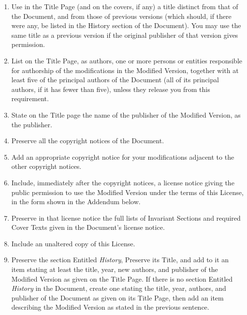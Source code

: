 \begin{enumerate}
\item Use in the Title Page (and on the covers, if any) a title
  distinct from that of the Document, and from those of previous
  versions (which should, if there were any, be listed in the History
  section of the Document).  You may use the same title as a previous
  version if the original publisher of that version gives permission.
   
\item List on the Title Page, as authors, one or more persons or
  entities responsible for authorship of the modifications in the
  Modified Version, together with at least five of the principal
  authors of the Document (all of its principal authors, if it has
  fewer than five), unless they release you from this requirement.
   
\item State on the Title page the name of the publisher of the
  Modified Version, as the publisher.
   
\item Preserve all the copyright notices of the Document.
   
\item Add an appropriate copyright notice for your modifications
  adjacent to the other copyright notices.
   
\item Include, immediately after the copyright notices, a license
  notice giving the public permission to use the Modified Version
  under the terms of this License, in the form shown in the Addendum
  below.
   
\item Preserve in that license notice the full lists of Invariant
  Sections and required Cover Texts given in the Document's license
  notice.
   
\item Include an unaltered copy of this License.
   
\item Preserve the section Entitled \emph{History}, Preserve its
  Title, and add to it an item stating at least the title, year, new
  authors, and publisher of the Modified Version as given on the Title
  Page.  If there is no section Entitled \emph{History} in the
  Document, create one stating the title, year, authors, and publisher
  of the Document as given on its Title Page, then add an item
  describing the Modified Version as stated in the previous sentence.
   

\end{enumerate}
